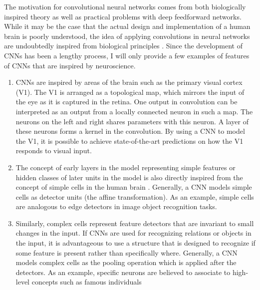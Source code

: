 The motivation for convolutional neural networks comes from both biologically inspired theory as well as practical problems with deep feedforward networks.\\ 

While it may be the case that the actual design and implementation of a human brain is poorly understood, the idea of applying convolutions in neural networks are undoubtedly inspired from biological principles \citep[p.~353]{dlbook}. Since the development of CNNs has been a lengthy process, I will only provide a few examples of features of CNNs that are inspired by neuroscience. \\

\begin{enumerate}

\item CNNs are inspired by areas of the brain such as the primary visual cortex (V1). The V1 is arranged as a topological map, which mirrors the input of the eye as it is captured in the retina. One output in convolution can be interpreted as an output from a locally connected neuron in such a map. The neurons on the left and right shares parameters with this neuron. A layer of these neurons forms a kernel in the convolution. By using a CNN to model the V1, it is possible to achieve state-of-the-art predictions on how the V1 responds to visual input\citep{cnn_sensory_coding}. \\

\item The concept of early layers in the model representing simple features or hidden classes of later units in the model is also directly inspired from the concept of simple cells in the human brain \citep{cnn_taxonomy}. Generally, a CNN models simple cells as detector units (the affine transformation). As an example, simple cells are analogous to edge detectors in image object recognition tasks.\\

\item Similarly, complex cells represent feature detectors that are invariant to small changes in the input. If CNNs are used for recognizing relations or objects in the input, it is advantageous to use a structure that is designed to recognize if some feature is present rather than specifically where. Generally, a CNN models complex cells as the pooling operation which is applied after the detectors. As an example, specific neurons are believed to associate to high-level concepts such as famous individuals \citep{visual_rep_brain}\\
 
\end{enumerate}

